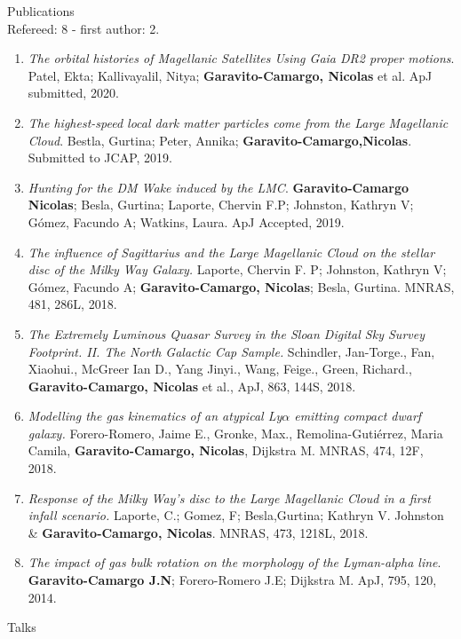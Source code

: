\documentclass[UTF8]{article}
\begin{document}
{\Large Publications}\\

\indent \indent Refereed: 8 - first author: 2.

\begin{enumerate}
\item \textit{The orbital histories of Magellanic Satellites Using Gaia DR2
  proper motions}. Patel, Ekta; Kallivayalil, Nitya; \textbf{Garavito-Camargo,
    Nicolas} et al. ApJ submitted, 2020.

\item \textit{The highest-speed local dark matter particles come from the Large
  Magellanic Cloud}. Bestla, Gurtina; Peter, Annika; \textbf{Garavito-Camargo,Nicolas}. Submitted to JCAP, 2019.
\item \textit{Hunting for the DM Wake induced by the LMC}.
  \textbf{Garavito-Camargo Nicolas}; Besla, Gurtina; Laporte, Chervin F.P;
    Johnston, Kathryn V; G\'omez, Facundo A; Watkins, Laura. ApJ Accepted, 2019.
\item \textit{The influence of Sagittarius and the Large Magellanic Cloud on the
  stellar disc of the Milky Way Galaxy.} Laporte, Chervin F. P; Johnston,
  Kathryn V; G\'omez, Facundo A; \textbf{Garavito-Camargo, Nicolas}; Besla,
    Gurtina. MNRAS, 481, 286L, 2018.
\item \textit{The Extremely Luminous Quasar Survey in the Sloan Digital Sky Survey Footprint. II. The North Galactic Cap Sample.} Schindler, Jan-Torge., Fan, Xiaohui., McGreer Ian D., Yang Jinyi., Wang, Feige., Green, Richard., \textbf{Garavito-Camargo, Nicolas} et al., ApJ, 863, 144S, 2018.
\item \textit{Modelling the gas kinematics of an atypical Ly$\alpha$
emitting compact dwarf galaxy.} Forero-Romero, Jaime E., Gronke, Max., Remolina-Gutiérrez, Maria Camila, \textbf{Garavito-Camargo, Nicolas}, Dijkstra M. MNRAS, 474, 12F, 2018.
\item \textit{Response of the Milky Way's disc to the Large Magellanic Cloud in
  a first infall scenario.} Laporte, C.; Gomez, F; Besla,Gurtina; Kathryn V. Johnston \& \textbf{Garavito-Camargo, Nicolas}. MNRAS, 473, 1218L, 2018.
 \item \textit{The impact of gas bulk rotation on the morphology of the
   Lyman-alpha line}. \textbf{Garavito-Camargo J.N}; Forero-Romero J.E;
    Dijkstra M. ApJ, 795, 120, 2014.
\end{enumerate}

{\Large Talks}\\
\end{document}
